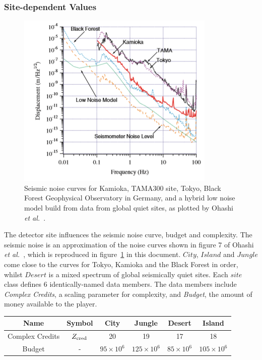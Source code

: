 \documentclass{article}
\begin{document}
\begin{appendix}
\subsubsection*{Site-dependent Values}
\label{sec:sites}
\begin{figure}
        \centering
        \includegraphics{noisecurves.PNG}        
\caption{Seismic noise curves for Kamioka, TAMA300 site, Tokyo, Black
  Forest Geophysical Observatory in Germany, and a hybrid low noise
  model build from data from global quiet sites, as plotted by Ohashi
  \textit{et al.}~\cite{CLIO}.}
        \label{fig:ohashi}
    \end{figure}
    The detector site influences the seismic noise curve, budget and
    complexity. The seismic noise is an approximation of the noise
    curves shown in figure 7 of Ohashi \textit{et al.}~\cite{CLIO},
    which is reproduced in figure~\ref{fig:ohashi} in
    this document. $City$, $Island$ and $Jungle$ come close to the
    curves for Tokyo, Kamioka and the Black Forest in order, whilst
    $Desert$ is a mixed spectrum of global seismically quiet
    sites. Each $site$ class defines 6 identically-named data
    members. The data members include \textit{Complex Credits}, a
    scaling parameter for complexity, and \textit{Budget}, the amount
    of money available to the player.
    \begin{center}
    \begin{tabular}{ |c|c|c|c|c|c| } 
     \hline
     \textbf{Name} & \textbf{Symbol} & \textbf{City}  & \textbf{Jungle}  & \textbf{Desert}  & \textbf{Island} \\ 
     \hline
     Complex Credits & $Z_{\rm cred}$ & 20 & 19 & 17 & 18\\ 
     \hline
     Budget & - & $95 \times 10^6$ & $125 \times 10^6$ & $85 \times 10^6$ & $105 \times 10^6$\\ 

\end{tabular}
\end{center}
\end{appendix}
\end{document}
